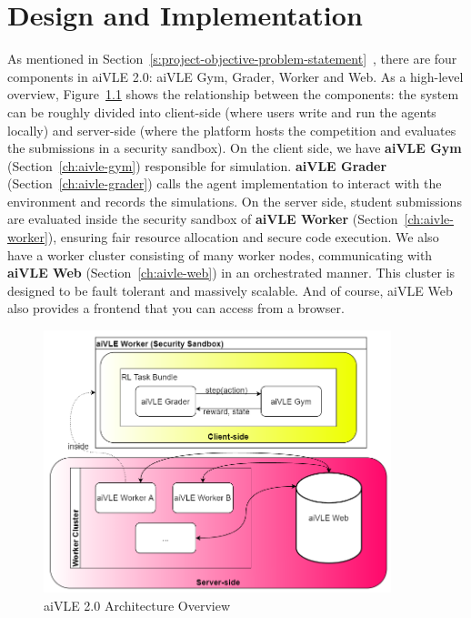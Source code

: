 \chapter{Design and Implementation}
\label{ch:design-and-impl}
As mentioned in Section~\ref{s:project-objective-problem-statement}~, there are four components in aiVLE 2.0: aiVLE Gym, Grader, Worker and Web. As a high-level overview, Figure~\ref{fig:architecture-overview} shows the relationship between the components: the system can be roughly divided into client-side (where users write and run the agents locally) and server-side (where the platform hosts the competition and evaluates the submissions in a security sandbox). On the client side, we have \textbf{aiVLE Gym} (Section~\ref{ch:aivle-gym}) responsible for simulation. \textbf{aiVLE Grader} (Section~\ref{ch:aivle-grader}) calls the agent implementation to interact with the environment and records the simulations. On the server side, student submissions are evaluated inside the security sandbox of \textbf{aiVLE Worker} (Section~\ref{ch:aivle-worker}), ensuring fair resource allocation and secure code execution. We also have a worker cluster consisting of many worker nodes, communicating with \textbf{aiVLE Web} (Section~\ref{ch:aivle-web}) in an orchestrated manner. This cluster is designed to be fault tolerant and massively scalable. And of course, aiVLE Web also provides a frontend that you can access from a browser.

\begin{figure}[H]
    \centering
    \includegraphics[width=0.9\textwidth]{images/architecture-overview.png}
    \caption{aiVLE 2.0 Architecture Overview}
    \label{fig:architecture-overview}
\end{figure}

